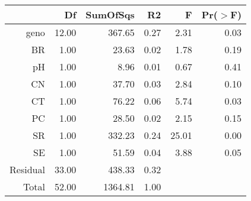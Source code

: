 \begin{table}[ht]
\centering
\begin{tabular}{rrrrrr}
  \hline
 & Df & SumOfSqs & R2 & F & Pr($>$F) \\ 
  \hline
geno & 12.00 & 367.65 & 0.27 & 2.31 & 0.03 \\ 
  BR & 1.00 & 23.63 & 0.02 & 1.78 & 0.19 \\ 
  pH & 1.00 & 8.96 & 0.01 & 0.67 & 0.41 \\ 
  CN & 1.00 & 37.70 & 0.03 & 2.84 & 0.10 \\ 
  CT & 1.00 & 76.22 & 0.06 & 5.74 & 0.03 \\ 
  PC & 1.00 & 28.50 & 0.02 & 2.15 & 0.15 \\ 
  SR & 1.00 & 332.23 & 0.24 & 25.01 & 0.00 \\ 
  SE & 1.00 & 51.59 & 0.04 & 3.88 & 0.05 \\ 
  Residual & 33.00 & 438.33 & 0.32 &  &  \\ 
  Total & 52.00 & 1364.81 & 1.00 &  &  \\ 
   \hline
\end{tabular}
\end{table}

